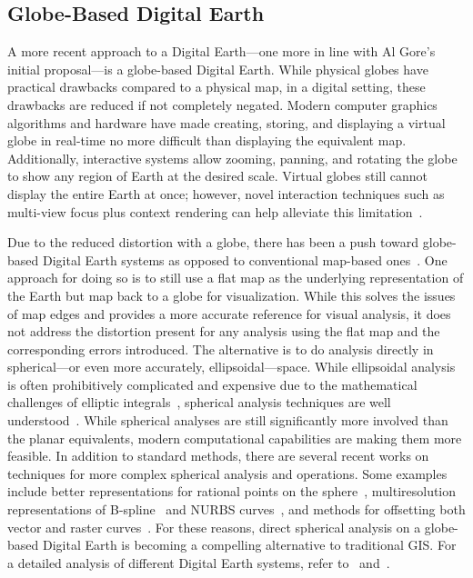\subsection{Globe-Based Digital Earth} \label{chap:2:globeDE}
A more recent approach to a Digital Earth---one more in line with Al Gore's initial proposal---is a globe-based Digital Earth.
While physical globes have practical drawbacks compared to a physical map, in a digital setting, these drawbacks are reduced if not completely negated.
Modern computer graphics algorithms and hardware have made creating, storing, and displaying a virtual globe in real-time no more difficult than displaying the equivalent map.
Additionally, interactive systems allow zooming, panning, and rotating the globe to show any region of Earth at the desired scale.
Virtual globes still cannot display the entire Earth at once; however, novel interaction techniques such as multi-view focus plus context rendering can help alleviate this limitation~\cite{sherlock2017visualizations}.


Due to the reduced distortion with a globe, there has been a push toward globe-based Digital Earth systems as opposed to conventional map-based ones~\cite{goodchild2018reimagining}.
One approach for doing so is to still use a flat map as the underlying representation of the Earth but map back to a globe for visualization.
While this solves the issues of map edges and provides a more accurate reference for visual analysis, it does not address the distortion present for any analysis using the flat map and the corresponding errors introduced.
The alternative is to do analysis directly in spherical---or even more accurately, ellipsoidal---space.
While ellipsoidal analysis is often prohibitively complicated and expensive due to the mathematical challenges of elliptic integrals~\cite{byrd2013handbook}, spherical analysis techniques are well understood~\cite{raskin1994spatial}.
While spherical analyses are still significantly more involved than the planar equivalents, modern computational capabilities are making them more feasible. 
In addition to standard methods, there are several recent works on techniques for more complex spherical analysis and operations.
Some examples include better representations for rational points on the sphere~\cite{bahrdt2017rational}, multiresolution representations of B-spline~\cite{alderson2016multiresolution} and NURBS curves~\cite{alderson2019multiscale}, and methods for offsetting both vector and raster curves~\cite{alderson2018offsetting}.
For these reasons, direct spherical analysis on a globe-based Digital Earth is becoming a compelling alternative to traditional GIS. For a detailed analysis of different Digital Earth systems, refer to~\cite{mahdavi2015survey} and~\cite{alderson2020digital}.


